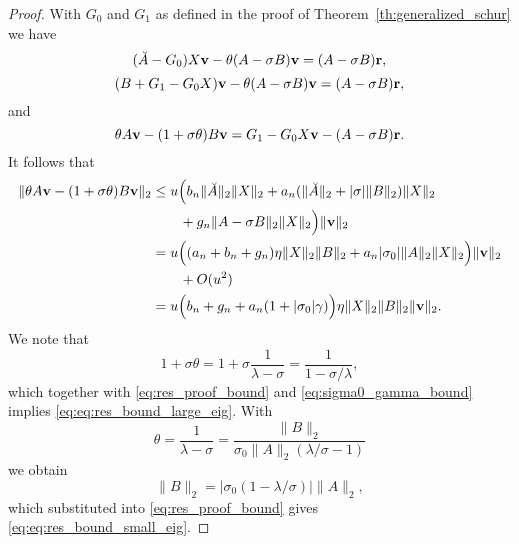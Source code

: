 \documentclass[12pt]{article}
\def\vec#1{{\bf #1}}
\begin{document}
\begin{proof}
  With $G_0$ and $G_1$ as defined in the proof of Theorem~\ref{th:generalized_schur} we have
  \begin{equation*}
    (\breve{A}-G_0)X \vec{v} - \theta(A-\sigma B) \vec{v} = (A-\sigma B)\vec{r},
  \end{equation*}
  \begin{equation*}
    (B + G_1 - G_0 X)\vec{v}- \theta(A-\sigma B) \vec{v} = (A-\sigma B)\vec{r},
  \end{equation*}
  and
  \begin{equation*}
    \theta A \vec{v} - (1+\sigma \theta) B\vec{v} = G_1\vec{} - G_0 X \vec{v} - (A-\sigma B)\vec{r}.
  \end{equation*}
  It follows that
  \begin{align}
    \| \theta A \vec{v} - (1+\sigma \theta) B\vec{v} \|_2 
    & \leq u \Big( b_n \|\breve{A}\|_2\|X\|_2 + a_n (\|\breve{A}\|_2
      + |\sigma| \|B\|_2) \|X\|_2 \nonumber\\
    & \qquad + g_n \|A-\sigma B\|_2 \|X\|_2 \Big) \|\vec{v}\|_2 \nonumber\\
    & = u \Big( (a_n+b_n+g_n) \eta \|X\|_2 \|B\|_2 
      + a_n |\sigma_0| \|A\|_2 \|X\|_2\Big) \|\vec{v}\|_2  \nonumber\\
    & \qquad + O(u^2) \nonumber\\
    & = u \Big( b_n + g_n  + a_n (1+|\sigma_0| \gamma)  \Big)\eta \|X\|_2\|B\|_2
      \|\vec{v}\|_2 \label{eq:res_proof_bound}.
  \end{align}
  We note that
  \begin{equation*}
    1+\sigma \theta 
    = 1 + \sigma \frac{1}{\lambda - \sigma} 
    = \frac{1}{1-\sigma/\lambda},
  \end{equation*}
  which together with \eqref{eq:res_proof_bound} and
  \eqref{eq:sigma0_gamma_bound} implies \eqref{eq:eq:res_bound_large_eig}.  With
  \begin{equation*}
    \theta 
    = \frac{1}{\lambda - \sigma} = \frac{\|B\|_2}{\sigma_0 \|A\|_2 (\lambda/\sigma - 1)}
  \end{equation*}
  we obtain
  \begin{equation*}
    \|B\|_2 = |\sigma_0(1- \lambda/\sigma)| \|A\|_2,
  \end{equation*}
  which substituted into \eqref{eq:res_proof_bound} gives
  \eqref{eq:eq:res_bound_small_eig}.
\end{proof}





\end{document}
